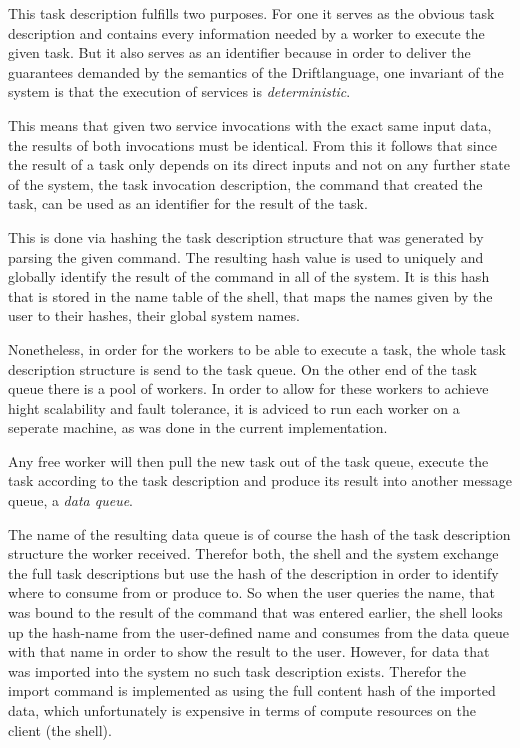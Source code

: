This task description fulfills two purposes. For one it serves
as the obvious task description and contains every information
needed by a worker to execute the given task. But it also serves
as an identifier because in order to deliver the guarantees
demanded by the semantics of the  Driftlanguage, one invariant of
the system is that the execution of services is \textit{deterministic}.

This means that given two service invocations with the exact same
input data, the results of both invocations must be identical.
From this it follows that since the result of a task only depends
on its direct inputs and not on any further state of the system,
the task invocation description, the command that created the
task, can be used as an identifier for the result of the task.

This is done via hashing the task description structure that was
generated by parsing the given command. The resulting hash value
is used to uniquely and globally identify the result of the command
in all of the system. It is this hash that is stored in the name
table of the shell, that maps the names given by the user to
their hashes, their global system names.
\newline

Nonetheless, in order for the workers to be able to execute a
task, the whole task description structure is send to the task
queue. On the other end of the task queue there is a pool of
workers. In order to allow for these workers to achieve hight
scalability and fault tolerance, it is adviced to run each worker
on a seperate machine, as was done in the current implementation.

Any free worker will then pull the new task out of the task queue,
execute the task according to the task description and produce its
result into another message queue, a \textit{data queue}.

The name of the resulting data queue is of course the hash of the
task description structure the worker received. Therefor both,
the shell and the system exchange the full task descriptions
but use the hash of the description in order to identify where
to consume from or produce to. So when the user queries the name,
that was bound to the result of the command that was entered
earlier, the shell looks up the hash-name from the user-defined
name and consumes from the data queue with that name in order to show
the result to the user. However, for data that was imported into
the system no such task description exists. Therefor the import
command is implemented as using the full content hash of the imported
data, which unfortunately is expensive in terms of compute resources
on the client (the shell).
\newline

